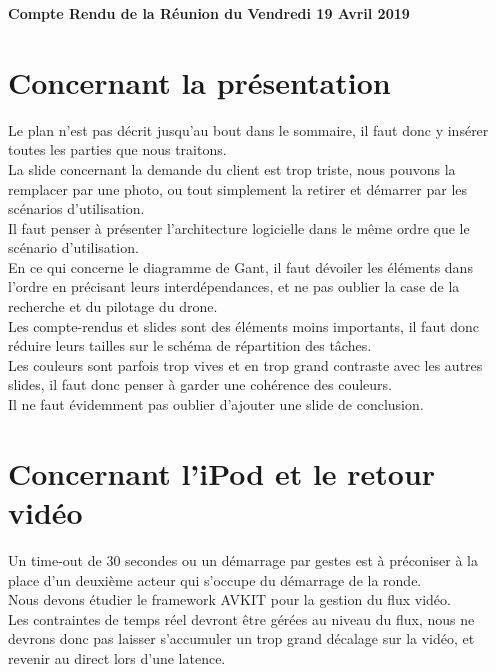 \documentclass[]{article}
\begin{document}
\pagestyle{fancy}
\renewcommand\headrulewidth{1pt}
\renewcommand\footrulewidth{1pt}

\begin{center}
\large{\textbf{Compte Rendu de la Réunion du Vendredi 19 Avril 2019 \bigbreak}}
\end{center}

\section{Concernant la présentation}
Le plan n'est pas décrit jusqu'au bout dans le sommaire, il faut donc y insérer toutes les parties que nous traitons.\\
La slide concernant la demande du client est trop triste, nous pouvons la remplacer par une photo, ou tout simplement la retirer et démarrer par les scénarios d'utilisation.\\
Il faut penser à présenter l'architecture logicielle dans le même ordre que le scénario d'utilisation.\\
En ce qui concerne le diagramme de Gant, il faut dévoiler les éléments dans l'ordre en précisant leurs interdépendances, et ne pas oublier la case de la recherche et du pilotage du drone.\\
Les compte-rendus et slides sont des éléments moins importants, il faut donc réduire leurs tailles sur le schéma de répartition des tâches.\\
Les couleurs sont parfois trop vives et en trop grand contraste avec les autres slides, il faut donc penser à garder une cohérence des couleurs.\\
Il ne faut évidemment pas oublier d'ajouter une slide de conclusion.

\section{Concernant l'iPod et le retour vidéo}
Un time-out de 30 secondes ou un démarrage par gestes est à préconiser à la place d'un deuxième acteur qui s'occupe du démarrage de la ronde.\\
Nous devons étudier le framework AVKIT pour la gestion du flux vidéo.\\
Les contraintes de temps réel devront être gérées au niveau du flux, nous ne devrons donc pas laisser s'accumuler un trop grand décalage sur la vidéo, et revenir au direct lors d'une latence.\\
\end{document}

